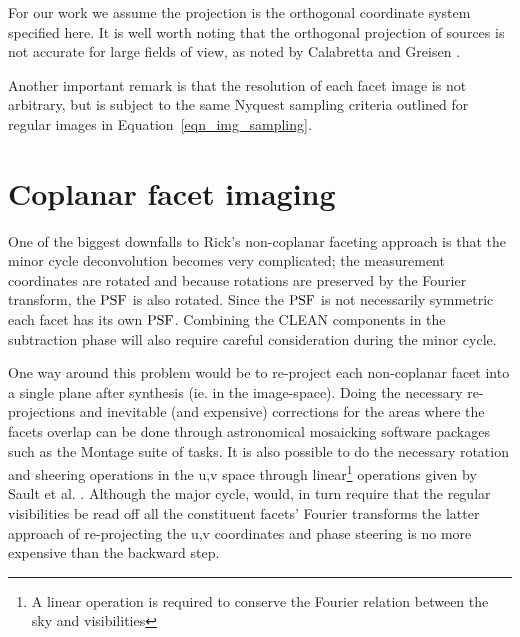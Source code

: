 For our work we assume the projection is the orthogonal coordinate system specified here. It is well worth noting 
that the orthogonal projection of sources is not accurate for large fields of view, as noted by Calabretta and Greisen 
\cite{calabretta2002representations}.

Another important remark is that the resolution of each facet image is not arbitrary, but is subject to the same Nyquest sampling 
criteria outlined for regular images in Equation~\ref{eqn_img_sampling}.
\section{Coplanar facet imaging}
One of the biggest downfalls to Rick's non-coplanar faceting approach is that the minor cycle deconvolution becomes very complicated; the measurement
coordinates are rotated and because rotations are preserved by the Fourier transform, the $\textrm{PSF}$ is also rotated. Since the $\textrm{PSF}$ is not necessarily 
symmetric each facet has its own $\textrm{PSF}$. Combining the CLEAN components in the subtraction phase will also require careful consideration during the minor cycle.

One way around this problem would be to re-project each non-coplanar facet into a single plane after synthesis (ie. in the image-space). Doing the necessary
re-projections and inevitable (and expensive) corrections for the areas where the facets overlap can be done through astronomical mosaicking software packages such as the
Montage \cite{jacob2004montage} suite of tasks. It is also possible to do the necessary rotation and sheering operations in the u,v space through 
linear\footnote{A linear operation is required to conserve the Fourier relation between the sky and visibilities} operations given by 
Sault et al. \cite[Appendix A]{sault1996approach}. Although the major cycle, would, in turn require that the regular visibilities be read off all
the constituent facets' Fourier transforms the latter approach of re-projecting the u,v coordinates and phase steering is no more expensive than the backward 
step.

